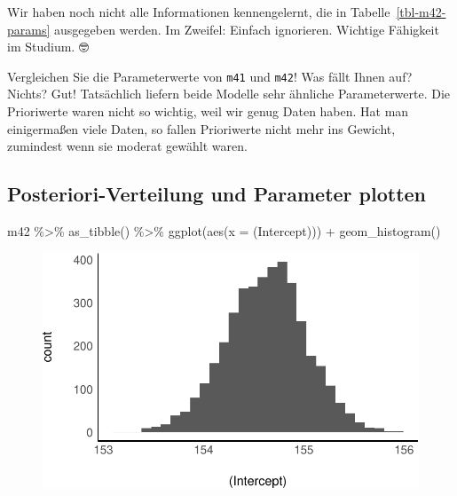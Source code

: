 \documentclass[
  a4paper,
  DIV=11]{scrreprt}
\newenvironment{Shaded}{\begin{snugshade}}{\end{snugshade}}
\newcommand{\AttributeTok}[1]{\textcolor[rgb]{0.40,0.45,0.13}{#1}}
\newcommand{\FunctionTok}[1]{\textcolor[rgb]{0.28,0.35,0.67}{#1}}
\newcommand{\NormalTok}[1]{\textcolor[rgb]{0.00,0.23,0.31}{#1}}
\newcommand{\SpecialCharTok}[1]{\textcolor[rgb]{0.37,0.37,0.37}{#1}}
\newcommand{\StringTok}[1]{\textcolor[rgb]{0.13,0.47,0.30}{#1}}
\theoremstyle{definition}
\theoremstyle{remark}
\begin{document}
Wir haben noch nicht alle Informationen kennengelernt, die in
Tabelle~\ref{tbl-m42-params} ausgegeben werden. Im Zweifel: Einfach
ignorieren. Wichtige Fähigkeit im Studium. 🤓

\begin{tcolorbox}[enhanced jigsaw, leftrule=.75mm, left=2mm, bottomrule=.15mm, opacityback=0, coltitle=black, colbacktitle=quarto-callout-important-color!10!white, opacitybacktitle=0.6, rightrule=.15mm, toptitle=1mm, colback=white, colframe=quarto-callout-important-color-frame, arc=.35mm, toprule=.15mm, breakable, titlerule=0mm, bottomtitle=1mm, title=\textcolor{quarto-callout-important-color}{\faExclamation}\hspace{0.5em}{Wichtig}]
Vergleichen Sie die Parameterwerte von \texttt{m41} und \texttt{m42}!
Was fällt Ihnen auf? Nichts? Gut! Tatsächlich liefern beide Modelle sehr
ähnliche Parameterwerte. Die Prioriwerte waren nicht so wichtig, weil
wir genug Daten haben. Hat man einigermaßen viele Daten, so fallen
Prioriwerte nicht mehr ins Gewicht, zumindest wenn sie moderat gewählt
waren.
\end{tcolorbox}

\hypertarget{posteriori-verteilung-und-parameter-plotten}{%
\subsection{Posteriori-Verteilung und Parameter
plotten}\label{posteriori-verteilung-und-parameter-plotten}}

\begin{Shaded}
\begin{Highlighting}[]
\NormalTok{m42 }\SpecialCharTok{\%\textgreater{}\%} 
  \FunctionTok{as\_tibble}\NormalTok{() }\SpecialCharTok{\%\textgreater{}\%} 
  \FunctionTok{ggplot}\NormalTok{(}\FunctionTok{aes}\NormalTok{(}\AttributeTok{x =} \StringTok{\textasciigrave{}}\AttributeTok{(Intercept)}\StringTok{\textasciigrave{}}\NormalTok{)) }\SpecialCharTok{+}
  \FunctionTok{geom\_histogram}\NormalTok{()}
\end{Highlighting}
\end{Shaded}

\begin{figure}[H]

{\centering \includegraphics{./gauss_files/figure-pdf/unnamed-chunk-8-1.pdf}

}

\end{figure}
\end{document}
